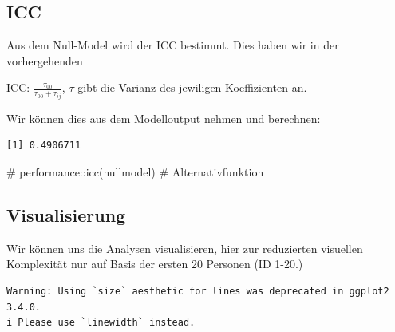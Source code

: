 \documentclass[
  letterpaper,
  DIV=11,
  numbers=noendperiod]{scrreprt}
\newenvironment{Shaded}{\begin{snugshade}}{\end{snugshade}}
\newcommand{\CommentTok}[1]{\textcolor[rgb]{0.37,0.37,0.37}{#1}}
\newcommand{\DecValTok}[1]{\textcolor[rgb]{0.68,0.00,0.00}{#1}}
\newcommand{\FunctionTok}[1]{\textcolor[rgb]{0.28,0.35,0.67}{#1}}
\newcommand{\NormalTok}[1]{\textcolor[rgb]{0.00,0.23,0.31}{#1}}
\newcommand{\OtherTok}[1]{\textcolor[rgb]{0.00,0.23,0.31}{#1}}
\newcommand{\SpecialCharTok}[1]{\textcolor[rgb]{0.37,0.37,0.37}{#1}}
\newcommand{\StringTok}[1]{\textcolor[rgb]{0.13,0.47,0.30}{#1}}
\begin{document}
\subsection{ICC}\label{icc-1}

Aus dem Null-Model wird der ICC bestimmt. Dies haben wir in der
vorhergehenden

ICC: \(\frac{\tau_{00}}{\tau_{00}+\tau_{ij}}\), \(\tau\) gibt die
Varianz des jewiligen Koeffizienten an.

Wir können dies aus dem Modelloutput nehmen und berechnen:

\begin{Shaded}
\end{Shaded}

\begin{verbatim}
[1] 0.4906711
\end{verbatim}

\begin{Shaded}
\begin{Highlighting}[]
\CommentTok{\# performance::icc(nullmodel) \# Alternativfunktion}
\end{Highlighting}
\end{Shaded}

\subsection{Visualisierung}\label{visualisierung}

Wir können uns die Analysen visualisieren, hier zur reduzierten
visuellen Komplexität nur auf Basis der ersten 20 Personen (ID 1-20.)

\begin{verbatim}
Warning: Using `size` aesthetic for lines was deprecated in ggplot2 3.4.0.
i Please use `linewidth` instead.
\end{verbatim}
\end{document}
